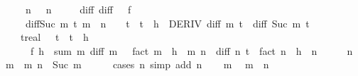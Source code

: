 \begin{isabellebody}
\ \ \ \ \ n{\isacharcolon}{\kern0pt}\ {\isachardoublequoteopen}{}\ {\isacharless}{\kern0pt}\ n{\isachardoublequoteclose}\isanewline
\ \ \ \ \ diff{\isacharunderscore}{\kern0pt}{}{\isacharcolon}{\kern0pt}\ {\isachardoublequoteopen}diff\ {}\ {\isacharequal}{\kern0pt}\ f{\isachardoublequoteclose}\isanewline
\ \ \ \ \ diff{\isacharunderscore}{\kern0pt}Suc{\isacharcolon}{\kern0pt}\ {\isachardoublequoteopen}{\isasymforall}m\ t{\isachardot}{\kern0pt}\ m\ {\isacharless}{\kern0pt}\ n\ {\isasymand}\ {}\ {\isasymle}\ t\ {\isasymand}\ t\ {\isasymle}\ h\ {\isasymlongrightarrow}\ DERIV\ {\isacharparenleft}{\kern0pt}diff\ m{\isacharparenright}{\kern0pt}\ t\ {\isacharcolon}{\kern0pt}{\isachargreater}{\kern0pt}\ diff\ {\isacharparenleft}{\kern0pt}Suc\ m{\isacharparenright}{\kern0pt}\ t{\isachardoublequoteclose}\isanewline
\ \ \isanewline
\ \ \ \ {\isachardoublequoteopen}{\isasymexists}t{\isacharcolon}{\kern0pt}{\isacharcolon}{\kern0pt}real{\isachardot}{\kern0pt}\ {}\ {\isacharless}{\kern0pt}\ t\ {\isasymand}\ t\ {\isacharless}{\kern0pt}\ h\ {\isasymand}\isanewline
\ \ \ \ \ \ f\ h\ {\isacharequal}{\kern0pt}\ sum\ {\isacharparenleft}{\kern0pt}{\isasymlambda}m{\isachardot}{\kern0pt}\ {\isacharparenleft}{\kern0pt}diff\ m\ {}\ {\isacharslash}{\kern0pt}\ fact\ m{\isacharparenright}{\kern0pt}\ {\isacharasterisk}{\kern0pt}\ h\ {\isacharcircum}{\kern0pt}\ m{\isacharparenright}{\kern0pt}\ {\isacharbraceleft}{\kern0pt}{\isachardot}{\kern0pt}{\isachardot}{\kern0pt}{\isacharless}{\kern0pt}n{\isacharbraceright}{\kern0pt}\ {\isacharplus}{\kern0pt}\ {\isacharparenleft}{\kern0pt}diff\ n\ t\ {\isacharslash}{\kern0pt}\ fact\ n{\isacharparenright}{\kern0pt}\ {\isacharasterisk}{\kern0pt}\ h\ {\isacharcircum}{\kern0pt}\ n{\isachardoublequoteclose}\isanewline
%
\isadelimproof
%
\endisadelimproof
%
\isatagproof
{}\isamarkupfalse%
\ {\isacharminus}{\kern0pt}\isanewline
\ \ \isamarkupfalse%
\ n\ \isamarkupfalse%
\ m\ \ m{\isacharcolon}{\kern0pt}\ {\isachardoublequoteopen}n\ {\isacharequal}{\kern0pt}\ Suc\ m{\isachardoublequoteclose}\isanewline
\ \ \ \ \isamarkupfalse%
\ {\isacharparenleft}{\kern0pt}cases\ n{\isacharparenright}{\kern0pt}\ {\isacharparenleft}{\kern0pt}simp\ add{\isacharcolon}{\kern0pt}\ n{\isacharparenright}{\kern0pt}\isanewline
\ \ \isamarkupfalse%
\ m\ \isamarkupfalse%
\ {\isachardoublequoteopen}m\ {\isacharless}{\kern0pt}\ n{\isachardoublequoteclose}\ \isamarkupfalse%

\end{isabellebody}
